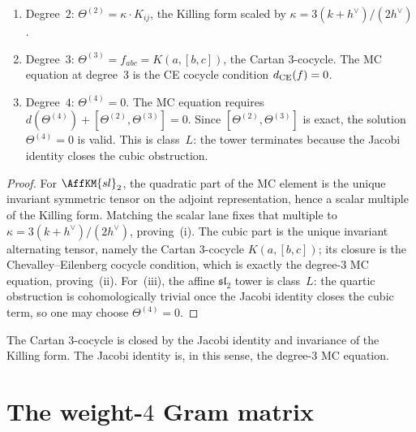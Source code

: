 \begin{proposition}
\label{prop:comp-explicit-theta-sl2}
\ClaimStatusProvedHere
\begin{enumerate}[label=\textup{(\roman*)}]
\item \textup{Degree~$2$}:
 $\Theta^{(2)} = \kappa \cdot K_{ij}$, the Killing form
 scaled by $\kappa = 3(k + h^\vee)/(2h^\vee)$.
\item \textup{Degree~$3$}:
 $\Theta^{(3)} = f_{abc} = K(a, [b, c])$, the Cartan $3$-cocycle.
 The MC equation at degree~$3$ is the CE cocycle condition
 $d_{\mathrm{CE}}(f) = 0$.
\item \textup{Degree~$4$}:
 $\Theta^{(4)} = 0$. The MC equation requires
 $d(\Theta^{(4)}) + [\Theta^{(2)}, \Theta^{(3)}] = 0$.
 Since $[\Theta^{(2)}, \Theta^{(3)}]$ is exact, the
 solution $\Theta^{(4)} = 0$ is valid. This is class~$L$:
 the tower terminates because the Jacobi identity closes
 the cubic obstruction.
\end{enumerate}
\end{proposition}

\begin{proof}
For $\AffKM{sl}_2$, the quadratic part of the MC element is the unique
invariant symmetric tensor on the adjoint representation, hence a
scalar multiple of the Killing form. Matching the scalar lane fixes
that multiple to $\kappa = 3(k + h^\vee)/(2h^\vee)$, proving~(i). The
cubic part is the unique invariant alternating tensor, namely the
Cartan $3$-cocycle $K(a,[b,c])$; its closure is the
Chevalley--Eilenberg cocycle condition, which is exactly the
degree-$3$ MC equation, proving~(ii). For~(iii), the affine
$\mathfrak{sl}_2$ tower is class~$L$: the quartic obstruction is
cohomologically trivial once the Jacobi identity closes the cubic
term, so one may choose $\Theta^{(4)}=0$.
\end{proof}

\begin{remark}[Jacobi as MC]
\label{rem:comp-jacobi-mc}
The Cartan $3$-cocycle is closed by the Jacobi identity and
invariance of the Killing form. The Jacobi identity is, in
this sense, the degree-$3$ MC equation.
\end{remark}


\section{The weight-$4$ Gram matrix}
\label{sec:comp-gram-matrix}

